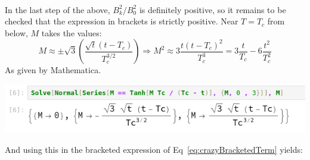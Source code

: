 \documentclass[12pt,a4]{article}
\begin{document}
\begin{enumerate}
\begin{enumerate}
\begin{align}
        \end{align}
        In the last step of the above, $B_k^2/ B_0^2$ is definitely positive, so it remains to be checked that the expression in brackets is strictly positive.
        Near $T = T_c$ from below, $M$ takes the values:
        \begin{equation}
          M \approx \pm \sqrt{3} \left(\frac{\sqrt{t}(t - T_c)}{T_c^{3/2}} \right) \Rightarrow M^2 \approx 3 \frac{t(t - T_c)^2}{T_c^3} = 3 \frac{t}{T_c} - 6\frac{t^2}{T_c^2} \label{eq:magnetization}
        \end{equation}
        As given by Mathematica.
        \begin{center}
          \includegraphics[scale = 0.8]{magnetization.png}
        \end{center}
        And using this in the bracketed expression of Eq~\ref{eq:crazyBracketedTerm} yields:

\end{enumerate}
\end{enumerate}
\end{document}
